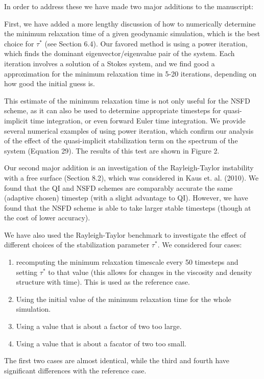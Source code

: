 \documentclass[a4paper,12pt]{article}
\begin{document}
In order to address these we have made two major additions to the manuscript:

First, we have added a more lengthy discussion of how to numerically determine the minimum relaxation time of
a given geodynamic simulation, which is the best choice for $\tau^*$ (see Section 6.4). Our favored method
is using a power iteration, which finds the dominant eigenvector/eigenvalue pair of the system.
Each iteration involves a solution of a Stokes system, and we find good a approximation for the minimum
relaxation time in 5-20 iterations, depending on how good the initial guess is.

This estimate of the minimum relaxation time is not only useful for the NSFD scheme,
as it can also be used to determine appropriate timesteps for quasi-implicit time integration,
or even forward Euler time integration. 
We provide several numerical examples of using power iteration, which confirm our analysis
of the effect of the quasi-implicit stabilization term on the spectrum of the system (Equation 29).
The results of this test are shown in Figure 2.

Our second major addition is an investigation of the Rayleigh-Taylor instability with a free surface (Section 8.2),
which was considered in Kaus et. al. (2010). We found that the QI and NSFD schemes are comparably
accurate the same (adaptive chosen) timestep (with a slight advantage to QI). However, we have found
that the NSFD scheme is able to take larger stable timesteps (though at the cost of lower accuracy).

We have also used the Rayleigh-Taylor benchmark to investigate the effect of different choices of 
the stabilization parameter $\tau^*$. We considered four cases: 
\begin{enumerate}
  \item recomputing the minimum relaxation timescale every 50 timesteps and setting $\tau^*$ to that value 
    (this allows for changes in the viscosity and density structure with time). This is used as the reference case.
  \item Using the initial value of the minimum relaxation time for the whole simulation.
  \item Using a value that is about a factor of two too large.
  \item Using a value that is about a facator of two too small.
\end{enumerate}
The first two cases are almost identical, while the third and fourth have significant differences with the reference case. 
\end{document}
